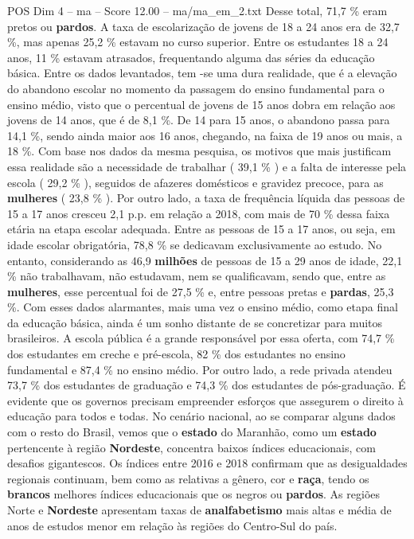 \begin{textsample}{POS Dim 4 – ma – Score 12.00 – ma/ma\_em\_2.txt}
Desse total, 71,7 \% eram pretos ou \textbf{pardos}.
A taxa de escolarização de jovens de 18 a 24 anos era de 32,7 \%, mas apenas 25,2 \% estavam no curso superior.
Entre os estudantes 18 a 24 anos, 11 \% estavam atrasados, frequentando alguma das séries da educação básica.
Entre os dados levantados, tem -se uma dura realidade, que é a elevação do abandono escolar no momento da passagem do ensino fundamental para o ensino médio, visto que o percentual de jovens de 15 anos dobra em relação aos jovens de 14 anos, que é de 8,1 \%.
De 14 para 15 anos, o abandono passa para 14,1 \%, sendo ainda maior aos 16 anos, chegando, na faixa de 19 anos ou mais, a 18 \%.
Com base nos dados da mesma pesquisa, os motivos que mais justificam essa realidade são a necessidade de trabalhar ( 39,1 \% ) e a falta de interesse pela escola ( 29,2 \% ), seguidos de afazeres domésticos e gravidez precoce, para as \textbf{mulheres} ( 23,8 \% ).
Por outro lado, a taxa de frequência líquida das pessoas de 15 a 17 anos cresceu 2,1 p.p. em relação a 2018, com mais de 70 \% dessa faixa etária na etapa escolar adequada.
Entre as pessoas de 15 a 17 anos, ou seja, em idade escolar obrigatória, 78,8 \% se dedicavam exclusivamente ao estudo.
No entanto, considerando as 46,9 \textbf{milhões} de pessoas de 15 a 29 anos de idade, 22,1 \% não trabalhavam, não estudavam, nem se qualificavam, sendo que, entre as \textbf{mulheres}, esse percentual foi de 27,5 \% e, entre pessoas pretas e \textbf{pardas}, 25,3 \%.
Com esses dados alarmantes, mais uma vez o ensino médio, como etapa final da educação básica, ainda é um sonho distante de se concretizar para muitos brasileiros.
A escola pública é a grande responsável por essa oferta, com 74,7 \% dos estudantes em creche e pré-escola, 82 \% dos estudantes no ensino fundamental e 87,4 \% no ensino médio.
Por outro lado, a rede privada atendeu 73,7 \% dos estudantes de graduação e 74,3 \% dos estudantes de pós-graduação.
É evidente que os governos precisam empreender esforços que assegurem o direito à educação para todos e todas.
No cenário nacional, ao se comparar alguns dados com o resto do Brasil, vemos que o \textbf{estado} do Maranhão, como um \textbf{estado} pertencente à região \textbf{Nordeste}, concentra baixos índices educacionais, com desafios gigantescos.
Os índices entre 2016 e 2018 confirmam que as desigualdades regionais continuam, bem como as relativas a gênero, cor e \textbf{raça}, tendo os \textbf{brancos} melhores índices educacionais que os negros ou \textbf{pardos}.
As regiões Norte e \textbf{Nordeste} apresentam taxas de \textbf{analfabetismo} mais altas e média de anos de estudos menor em relação às regiões do Centro-Sul do país.

\end{textsample}

